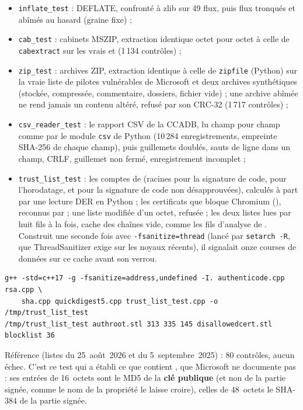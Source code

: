 \documentclass[11pt,a4paper,oneside]{report}
\begin{document}
\begin{itemize}
  \item \texttt{inflate\_test} : DEFLATE, confronté à zlib sur 49 flux, puis
    flux tronqués et abîmés au hasard (graine fixe) ;
  \item \texttt{cab\_test} : cabinets MSZIP, extraction identique octet pour
    octet à celle de \texttt{cabextract} sur les vrais 
    et  (1\,134 contrôles) ;
  \item \texttt{zip\_test} : archives ZIP, extraction identique à celle de
    \texttt{zipfile} (Python) sur la vraie liste de pilotes vulnérables de
    Microsoft et deux archives synthétiques (stockée, compressée, commentaire,
    dossiers, fichier vide) ; une archive abîmée ne rend jamais un contenu
    altéré, refusé par son CRC-32 (1\,717 contrôles) ;
  \item \texttt{csv\_reader\_test} : le rapport CSV de la CCADB, lu champ
    pour champ comme par le module \texttt{csv} de Python (10\,284
    enregistrements, empreinte SHA-256 de chaque champ), puis guillemets
    doublés, sauts de ligne dans un champ, CRLF, guillemet non fermé,
    enregistrement incomplet ;
  \item \texttt{trust\_list\_test} : les comptes de 
    (racines pour la signature de code, pour l'horodatage, et pour la signature
    de code non désapprouvées), calculés à part par une lecture DER en Python ;
    les certificats que bloque Chromium (),
    reconnus par  ; une liste modifiée d'un octet,
    refusée ; les deux listes lues par huit fils à la fois, cache des chaînes
    vide, comme les fils d'analyse de  . Construit
    une seconde fois avec \texttt{-fsanitize=thread} (lancé par
    \texttt{setarch -R}, que ThreadSanitizer exige sur les noyaux récents), il
    signalait onze courses de données sur ce cache avant son verrou.
\end{itemize}

\begin{lstlisting}
g++ -std=c++17 -g -fsanitize=address,undefined -I. authenticode.cpp rsa.cpp \
    sha.cpp quickdigest5.cpp trust_list_test.cpp -o /tmp/trust_list_test
/tmp/trust_list_test authroot.stl 313 335 145 disallowedcert.stl blocklist 36
\end{lstlisting}

Référence (listes du 25~août~2026 et du 5~septembre~2025) : 80 contrôles, aucun
échec. C'est ce test qui a établi ce que contient \fichier{disallowedcert.stl},
que Microsoft ne documente pas : ses entrées de 16~octets sont le MD5 de la
\textbf{clé publique} (et non de la partie signée, comme le nom de la propriété
le laisse croire), celles de 48~octets le SHA-384 de la partie signée.
\end{document}
